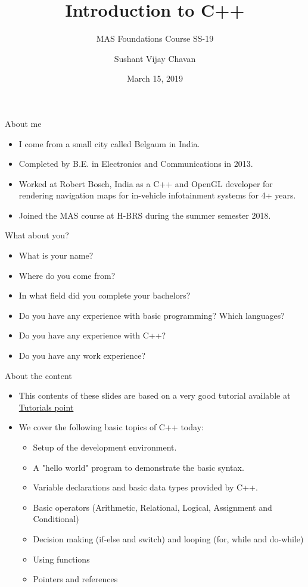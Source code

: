 \documentclass[aspectratio=169]{beamer}
\author[Chavan]{Sushant Vijay Chavan}
\title{Introduction to C++}
\subtitle{MAS Foundations Course SS-19}
\institute[HBRS]{Hochschule Bonn-Rhein-Sieg}
\date{March 15, 2019}
\begin{document}
{
\begin{frame}
\titlepage
\end{frame}
}

\begin{frame}{About me}
	\begin{itemize}
		\item I come from a small city called Belgaum in India.
		\item Completed by B.E. in Electronics and Communications in 2013.
		\item Worked at Robert Bosch, India as a C++ and OpenGL developer for rendering navigation maps for in-vehicle infotainment systems for 4+ years.
		\item Joined the MAS course at H-BRS during the summer semester 2018.
	\end{itemize}
\end{frame}

\begin{frame}{What about you?}
	\begin{itemize}
		\item What is your name?
		\item Where do you come from?
		\item In what field did you complete your bachelors?
		\item Do you have any experience with basic programming? Which languages?
		\item Do you have any experience with C++?
		\item Do you have any work experience?
	\end{itemize}
\end{frame}

\begin{frame}{About the content}
	\begin{itemize}
		\item This contents of these slides are based on a very good tutorial available at \href{https://www.tutorialspoint.com/cplusplus/index.htm}{Tutorials point}
		\item We cover the following basic topics of C++ today:
		\begin{itemize}
			\item Setup of the development environment.
			\item A "hello world" program to demonstrate the basic syntax.
			\item Variable declarations and basic data types provided by C++.
			\item Basic operators (Arithmetic, Relational, Logical, Assignment and Conditional)
			\item Decision making (if-else and switch) and looping (for, while and do-while)
			\item Using functions
			\item Pointers and references
		\end{itemize}
	\end{itemize}
\end{frame}
\end{document}
